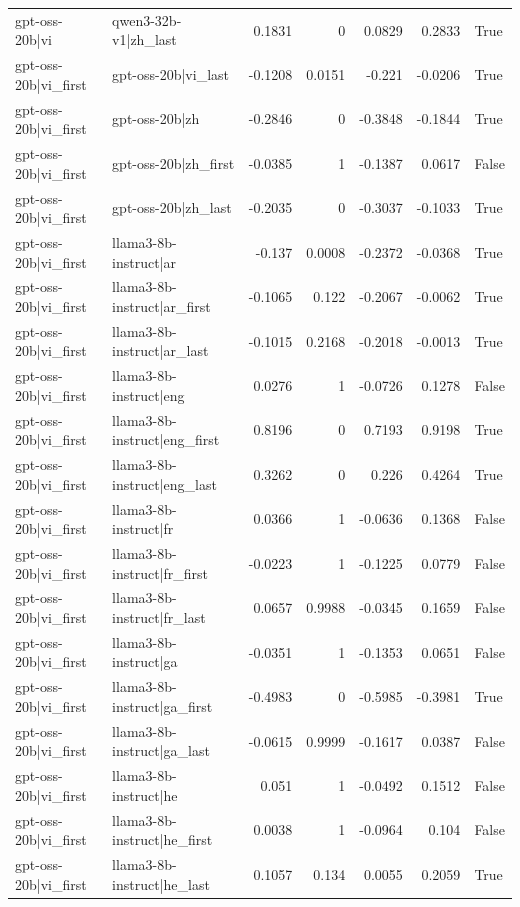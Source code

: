 \begin{table}
\begin{tabular}{l l r r r r l}
gpt-oss-20b|vi & qwen3-32b-v1|zh_last & 0.1831 & 0 & 0.0829 & 0.2833 & True \\
gpt-oss-20b|vi_first & gpt-oss-20b|vi_last & -0.1208 & 0.0151 & -0.221 & -0.0206 & True \\
gpt-oss-20b|vi_first & gpt-oss-20b|zh & -0.2846 & 0 & -0.3848 & -0.1844 & True \\
gpt-oss-20b|vi_first & gpt-oss-20b|zh_first & -0.0385 & 1 & -0.1387 & 0.0617 & False \\
gpt-oss-20b|vi_first & gpt-oss-20b|zh_last & -0.2035 & 0 & -0.3037 & -0.1033 & True \\
gpt-oss-20b|vi_first & llama3-8b-instruct|ar & -0.137 & 0.0008 & -0.2372 & -0.0368 & True \\
gpt-oss-20b|vi_first & llama3-8b-instruct|ar_first & -0.1065 & 0.122 & -0.2067 & -0.0062 & True \\
gpt-oss-20b|vi_first & llama3-8b-instruct|ar_last & -0.1015 & 0.2168 & -0.2018 & -0.0013 & True \\
gpt-oss-20b|vi_first & llama3-8b-instruct|eng & 0.0276 & 1 & -0.0726 & 0.1278 & False \\
gpt-oss-20b|vi_first & llama3-8b-instruct|eng_first & 0.8196 & 0 & 0.7193 & 0.9198 & True \\
gpt-oss-20b|vi_first & llama3-8b-instruct|eng_last & 0.3262 & 0 & 0.226 & 0.4264 & True \\
gpt-oss-20b|vi_first & llama3-8b-instruct|fr & 0.0366 & 1 & -0.0636 & 0.1368 & False \\
gpt-oss-20b|vi_first & llama3-8b-instruct|fr_first & -0.0223 & 1 & -0.1225 & 0.0779 & False \\
gpt-oss-20b|vi_first & llama3-8b-instruct|fr_last & 0.0657 & 0.9988 & -0.0345 & 0.1659 & False \\
gpt-oss-20b|vi_first & llama3-8b-instruct|ga & -0.0351 & 1 & -0.1353 & 0.0651 & False \\
gpt-oss-20b|vi_first & llama3-8b-instruct|ga_first & -0.4983 & 0 & -0.5985 & -0.3981 & True \\
gpt-oss-20b|vi_first & llama3-8b-instruct|ga_last & -0.0615 & 0.9999 & -0.1617 & 0.0387 & False \\
gpt-oss-20b|vi_first & llama3-8b-instruct|he & 0.051 & 1 & -0.0492 & 0.1512 & False \\
gpt-oss-20b|vi_first & llama3-8b-instruct|he_first & 0.0038 & 1 & -0.0964 & 0.104 & False \\
gpt-oss-20b|vi_first & llama3-8b-instruct|he_last & 0.1057 & 0.134 & 0.0055 & 0.2059 & True \\

\end{tabular}
\end{table}

